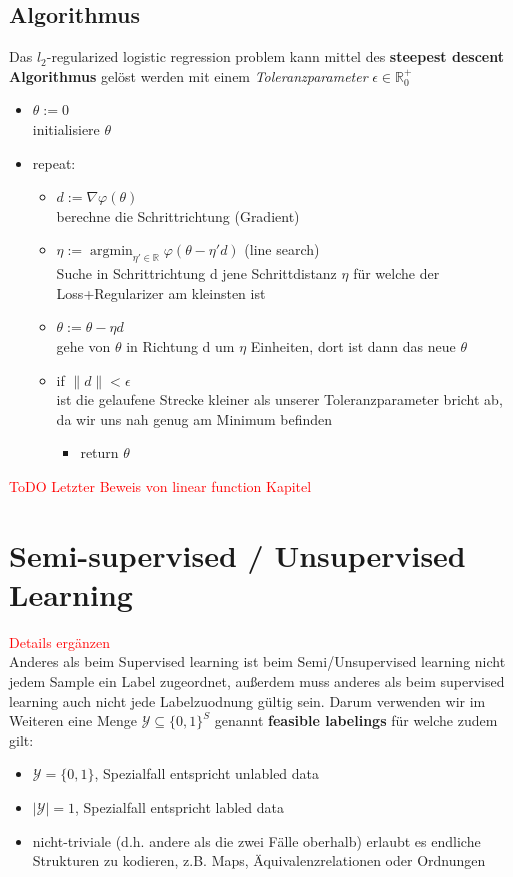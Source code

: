 \documentclass[12pt,a4paper]{article}
\DeclareMathOperator*{\argmin}{argmin}
\newcommand{\red}[1]{\textcolor{red} {#1}}
\begin{document}
\subsection{Algorithmus}
Das $l_2$-regularized logistic regression problem kann mittel des \textbf{steepest descent Algorithmus} gelöst werden mit einem \textit{Toleranzparameter} $\epsilon \in \mathbb{R}^+_0$
\begin{itemize}
\item $\theta := 0$\\
initialisiere $\theta$
\item repeat:
\begin{itemize}
\item $d := \nabla \varphi(\theta)$\\
berechne die Schrittrichtung (Gradient)
\item $\displaystyle \eta := \argmin_{\eta'\in\mathbb{R}} \varphi(\theta - \eta'd)$ (line search)\\
Suche in Schrittrichtung d jene Schrittdistanz $\eta$ für welche der Loss+Regularizer am kleinsten ist
\item $\theta := \theta - \eta d$\\
gehe von $\theta$ in Richtung d um $\eta$ Einheiten, dort ist dann das neue $\theta$
\item if $\|d\| < \epsilon$\\
ist die gelaufene Strecke kleiner als unserer Toleranzparameter bricht ab, da wir uns nah genug am Minimum befinden
\begin{itemize}
\item return $\theta$
\end{itemize}
\end{itemize}	
\end{itemize}

\red{ToDO Letzter Beweis von linear function Kapitel}

\section{Semi-supervised / Unsupervised Learning}
\red{Details ergänzen}\\
Anderes als beim Supervised learning ist beim Semi/Unsupervised learning nicht jedem Sample ein Label zugeordnet, außerdem muss anderes als beim supervised learning auch nicht jede Labelzuodnung gültig sein. Darum verwenden wir im Weiteren eine Menge $\mathcal{Y} \subseteq \{0,1\}^S$ genannt \textbf{feasible labelings} für welche zudem gilt:
\begin{itemize}
\item $\mathcal{Y} = \{0,1\}$, Spezialfall entspricht unlabled data
\item $|\mathcal{Y}| = 1$, Spezialfall entspricht labled data
\item nicht-triviale (d.h. andere als die zwei Fälle oberhalb) erlaubt es endliche Strukturen zu kodieren, z.B. Maps, Äquivalenzrelationen oder Ordnungen
\end{itemize}
\end{document}
